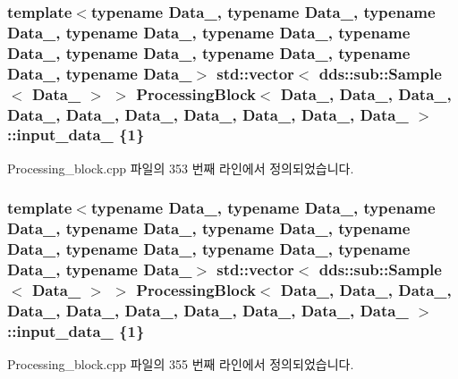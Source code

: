 \subsubsection[{\texorpdfstring{input\+\_\+data\+\_\+1}{input_data_1}}]{\setlength{\rightskip}{0pt plus 5cm}template$<$typename Data\+\_, typename Data\+\_, typename Data\+\_, typename Data\+\_, typename Data\+\_, typename Data\+\_, typename Data\+\_, typename Data\+\_, typename Data\+\_, typename Data\+\_$>$ std\+::vector$<$ dds\+::sub\+::\+Sample$<$ Data\+\_ $>$ $>$ {\bf Processing\+Block}$<$ Data\+\_, Data\+\_, Data\+\_, Data\+\_, Data\+\_, Data\+\_, Data\+\_, Data\+\_, Data\+\_, Data\+\_ $>$\+::input\+\_\+data\+\_ \{1\}}\hypertarget{classProcessingBlock_a6cfd229eb541713b280ce3974353371e}{}\label{classProcessingBlock_a6cfd229eb541713b280ce3974353371e}


Processing\+\_\+block.\+cpp 파일의 353 번째 라인에서 정의되었습니다.

\subsubsection[{\texorpdfstring{input\+\_\+data\+\_\+2}{input_data_2}}]{\setlength{\rightskip}{0pt plus 5cm}template$<$typename Data\+\_, typename Data\+\_, typename Data\+\_, typename Data\+\_, typename Data\+\_, typename Data\+\_, typename Data\+\_, typename Data\+\_, typename Data\+\_, typename Data\+\_$>$ std\+::vector$<$ dds\+::sub\+::\+Sample$<$ Data\+\_ $>$ $>$ {\bf Processing\+Block}$<$ Data\+\_, Data\+\_, Data\+\_, Data\+\_, Data\+\_, Data\+\_, Data\+\_, Data\+\_, Data\+\_, Data\+\_ $>$\+::input\+\_\+data\+\_ \{1\}}\hypertarget{classProcessingBlock_a51dcc687a3cb48a3180b16e2d73aacef}{}\label{classProcessingBlock_a51dcc687a3cb48a3180b16e2d73aacef}


Processing\+\_\+block.\+cpp 파일의 355 번째 라인에서 정의되었습니다.

